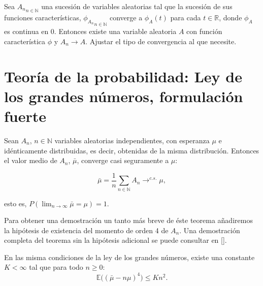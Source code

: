 \documentclass[../proyecto.tex]{memoir}
\begin{document}
\begin{teorema}
Sea ${ A_n }_{n \in \mathds{N}}$ una sucesión de variables aleatorias tal que la sucesión de sus funciones características, ${\phi_{A_n}}_{n \in \mathds{N}}$ converge a $\phi_{A}(t)$ para cada $t\in \mathds{R}$, donde $\phi_{A}$ es continua en 0. Entonces existe una variable aleatoria $A$ con función característica $\phi$ y $A_n \to A$. Ajustar el tipo de convergencia al que necesite.
\end{teorema}


\section{Teoría de la probabilidad: Ley de los grandes números, formulación fuerte}
\begin{teorema}
Sean $A_n$, $n \in \mathds{N}$ variables aleatorias independientes, con esperanza $\mu$ e idénticamente distribuidas, es decir, obtenidas de la misma distribución. Entonces el valor medio de $A_n$, $\bar{\mu}$, converge casi seguramente a $\mu$:

$$
 \bar{\mu}=\frac{1}{n}\sum_{n\in\mathds{N}} A_n \to^{c.s.} \mu,
$$

esto es, $P(\lim_{n\to\infty} \bar{\mu}=\mu) = 1$.

\end{teorema}

Para obtener una demostración un tanto más breve de éste teorema añadiremos la hipótesis de existencia del momento de orden 4 de $A_n$. Una demostración completa del teorema sin la hipótesis adicional se puede consultar en [].

\begin{lema}
En las misma condiciones de la ley de los grandes números, existe una constante $ K < \infty $ tal que para todo $ n \geq 0$:
$$
	\mathds{E} \big( ( \bar{ \mu } - n \mu ) ^ 4 \big) \leq K n^2.
$$
\end{lema}
\end{document}
